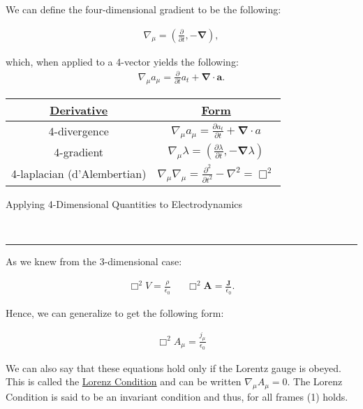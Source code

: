 \documentclass{article}
\newcommand{\header}[1]{\begin{large}\noindent #1\end{large}\\\rule{\textwidth}{0.5pt}}
\newcommand{\gap}{\medskip\\}
\newcommand{\ds}{\displaystyle}
\begin{document}
We can define the four-dimensional gradient to be the following:

\begin{align*}
    \nabla_\mu = \left(\frac{\partial}{\partial t}, -\pmb{\nabla} \right),
\end{align*}

which, when applied to a 4-vector yields the following:
\begin{align*}
    \nabla_\mu a_\mu = \frac{\partial}{\partial t} a_t + \pmb{\nabla} \cdot \mathbf{a}.
\end{align*}

\renewcommand{\arraystretch}{3}
\begin{tabular}{|c|c|}
    \hline
    \underline{Derivative} & \underline{Form} \\
    \hline
    4-divergence & $\ds \nabla_\mu a_\mu = \frac{\partial a_t}{\partial t} + \pmb{\nabla} \cdot{a}$ \\
    \hline
    4-gradient & $\ds \nabla_\mu \lambda = \left(\frac{\partial \lambda}{\partial t}, - \pmb{\nabla} \lambda\right)$ \\
    \hline
    4-laplacian (d'Alembertian) & $\ds \nabla_\mu \nabla_\mu = \frac{\partial^2}{\partial t^2} - \nabla^2 = \Box^2$\\
    \hline
\end{tabular}

\vspace{1cm}
\header{Applying 4-Dimensional Quantities to Electrodynamics}

As we knew from the 3-dimensional case:

\begin{align*}
    \Box^2 V = \frac{\rho}{\epsilon_0} && \Box^2 \mathbf{A} = \frac{\mathbf{J}}{\epsilon_0}.
\end{align*}

Hence, we can generalize to get the following form:

\begin{align}
    \Box^2 A_\mu = \frac{j_\mu}{\epsilon_0}
\end{align}

We can also say that these equations hold only if the Lorentz 
gauge is obeyed. This is called the \underline{Lorenz Condition} and 
can be written $\nabla_\mu A_\mu = 0$. The Lorenz Condition is said 
to be an invariant condition and thus, for all frames (1) holds.
\gap
\end{document}
